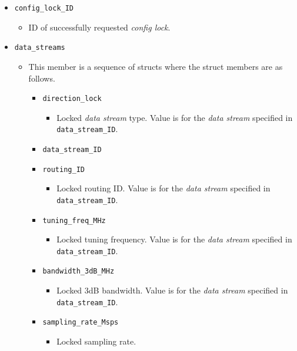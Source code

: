 \documentclass{article}
\begin{document}
  \begin{itemize}
    \item \verb+config_lock_ID+
      \begin{itemize}
        \item ID of successfully requested \textit{config lock}.
      \end{itemize}
    \item \verb+data_streams+
      \begin{itemize}
        \item This member is a sequence of structs where the struct members are as follows.
          \begin{itemize}
            \item \verb+direction_lock+
              \begin{itemize}
                \item Locked \textit{data stream} type.
                  Value is for the \textit{data stream} specified in
                  \verb+data_stream_ID+.
              \end{itemize}
            \item \verb+data_stream_ID+
            \item \verb+routing_ID+
              \begin{itemize}
                \item Locked routing ID.
                  Value is for the \textit{data stream} specified in
                  \verb+data_stream_ID+.
              \end{itemize}
            \item \verb+tuning_freq_MHz+
              \begin{itemize}
                \item Locked tuning frequency.
                  Value is for the \textit{data stream} specified in
                  \verb+data_stream_ID+.
              \end{itemize}
            \item \verb+bandwidth_3dB_MHz+
              \begin{itemize}
                \item Locked 3dB bandwidth.
                  Value is for the \textit{data stream} specified in
                  \verb+data_stream_ID+.
              \end{itemize}
            \item \verb+sampling_rate_Msps+
              \begin{itemize}
                \item Locked sampling rate.

\end{itemize}
\end{itemize}
\end{itemize}
\end{itemize}
\end{document}
